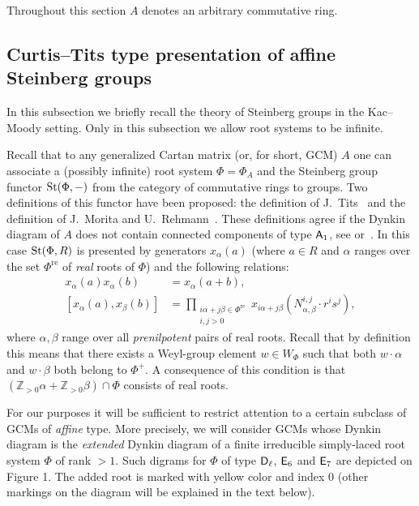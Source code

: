 Throughout this section $A$ denotes an arbitrary commutative ring.

\subsection{Curtis--Tits type presentation of affine Steinberg groups} \label{subsec:curtis-tits}
In this subsection we briefly recall the theory of Steinberg groups in the Kac--Moody setting.
Only in this subsection we allow root systems to be infinite.

Recall that to any generalized Cartan matrix (or, for short, GCM) $A$ one can associate a (possibly infinite) root system $\Phi = \Phi_A$ and the Steinberg group functor $\operatorname{St}(\Phi, -)$ from the category of commutative rings to groups.
Two definitions of this functor have been proposed: the definition of J.~Tits~\cite[\S~3.6]{Ti87} and the definition of J.~Morita and U.~Rehmann~\cite[\S~2]{MR90}.
These definitions agree if the Dynkin diagram of $A$ does not contain connected components of type $\mathsf{A}_1$, see \cite[\S~3]{A16} or~\cite[\S~6]{A13}.
In this case $\operatorname{St}(\Phi, R)$ is presented by generators $x_\alpha(a)$ (where $a \in R$ and $\alpha$ ranges over the set $\Phi^\mathrm{re}$ of {\it real} roots of $\Phi$)
 and the following relations:
\begin{align}
    x_\alpha(a) x_\alpha(b) & =  x_\alpha(a + b), \\
    [x_\alpha(a), x_\beta(b)] & =  \prod \limits_{\substack{i\alpha+j\beta \in \Phi^\mathrm{re} \\ i, j > 0 }} x_{i\alpha+j\beta}(N_{\alpha, \beta}^{i, j} \cdot r^i s^j),
\end{align}
where $\alpha, \beta$ range over all {\it prenilpotent} pairs of real roots.
Recall that by definition this means that there exists a Weyl-group element $w \in W_\Phi$ such that both
 $w\cdot \alpha$ and $w \cdot \beta$ both belong to $\Phi^+.$
A consequence of this condition is that $(\mathbb{Z}_{>0} \alpha + \mathbb{Z}_{>0}\beta)\cap \Phi$ consists of real roots.

For our purposes it will be sufficient to restrict attention to a certain subclass of GCMs of \textit{affine} type.
More precisely, we will consider GCMs whose Dynkin diagram is the \textit{extended} Dynkin diagram of a finite irreducible simply-laced root system $\Phi$ of rank $>1$.
Such digrams for $\Phi$ of type $\mathsf{D}_\ell$, $\mathsf{E}_6$ and $\mathsf{E}_7$ are depicted on Figure 1.
The added root is marked with yellow color and index $0$ (other markings on the diagram will be explained in the text below).

